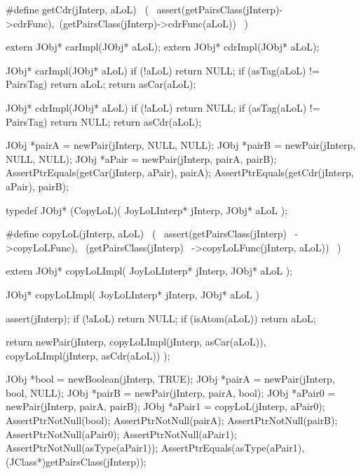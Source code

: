 #define getCdr(jInterp, aLoL)               \
  (                                         \
    assert(getPairsClass(jInterp)->cdrFunc),\
    (getPairsClass(jInterp)->cdrFunc(aLoL)) \
  )
\stopCHeader

\startCHeader
extern JObj* carImpl(JObj* aLoL);
extern JObj* cdrImpl(JObj* aLoL);
\stopCHeader
{}

\startCCode
JObj* carImpl(JObj* aLoL) {
  if (!aLoL) return NULL;
  if (asTag(aLoL) != PairsTag) return aLoL;
  return asCar(aLoL);
}

JObj* cdrImpl(JObj* aLoL) {
  if (!aLoL) return NULL;
  if (asTag(aLoL) != PairsTag) return NULL;
  return asCdr(aLoL);
}
\stopCCode


\startCTest
  JObj *pairA = newPair(jInterp, NULL, NULL);
  JObj *pairB = newPair(jInterp, NULL, NULL);
  JObj *aPair = newPair(jInterp, pairA, pairB);
  AssertPtrEquals(getCar(jInterp, aPair), pairA);
  AssertPtrEquals(getCdr(jInterp, aPair), pairB);
\stopCTest
\stopTestCase
\stopTestSuite

\startTestSuite[copyLoL]

\startCHeader
typedef JObj* (CopyLoL)(
  JoyLoLInterp* jInterp,
  JObj* aLoL
);

#define copyLoL(jInterp, aLoL)      \
  (                                 \
    assert(getPairsClass(jInterp)   \
      ->copyLoLFunc),               \
    (getPairsClass(jInterp)         \
      ->copyLoLFunc(jInterp, aLoL)) \
  )
\stopCHeader

\startCHeader
extern JObj* copyLoLImpl(
  JoyLoLInterp* jInterp,
  JObj* aLoL
);
\stopCHeader
{}

\startCCode
JObj* copyLoLImpl(
  JoyLoLInterp* jInterp,
  JObj* aLoL
) {
  assert(jInterp);
  if (!aLoL) return NULL;
  if (isAtom(aLoL)) return aLoL;

  return newPair(jInterp,
                 copyLoLImpl(jInterp, asCar(aLoL)),
                 copyLoLImpl(jInterp, asCdr(aLoL))
                 );
}
\stopCCode


\startCTest
  JObj *bool   = newBoolean(jInterp, TRUE);
  JObj *pairA  = newPair(jInterp, bool, NULL);
  JObj *pairB  = newPair(jInterp, pairA, bool);
  JObj *aPair0 = newPair(jInterp, pairA, pairB);
  JObj *aPair1 = copyLoL(jInterp, aPair0);
  AssertPtrNotNull(bool);
  AssertPtrNotNull(pairA);
  AssertPtrNotNull(pairB);
  AssertPtrNotNull(aPair0);
  AssertPtrNotNull(aPair1);
  AssertPtrNotNull(asType(aPair1));
  AssertPtrEquals(asType(aPair1),
    (JClass*)getPairsClass(jInterp));

